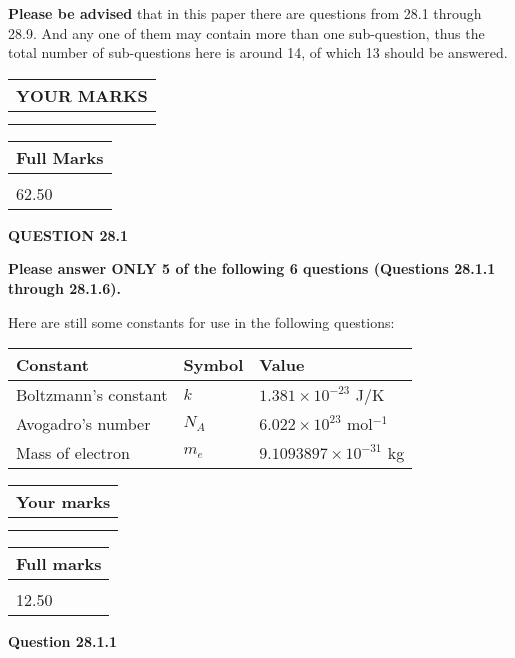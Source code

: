 \documentclass[12pt]{article}
\begin{document}
 
{\textbf{\large{Please be advised}}} that in this paper there are questions from
28.1 through
28.9.
And any one of them may contain more than one sub-question, thus the total number
of sub-questions here is around 14, of which
13 should be answered.
 
\vspace{0.3in}
 
 
   
   
  
\vspace{0.2in}
  
\noindent\begin{tabular}{|l|}
\hline
 YOUR MARKS  \\
\hline
 \\ 
 \\ 
\hline
\end{tabular}
\hspace{0.05in} \begin{tabular}{|l|}
\hline
 Full Marks  \\
\hline
 \\ 
62.50 \\
\hline
\end{tabular}
{\textbf{\Large{QUESTION
28.1 
}}}
  
  
 
{\textbf{\Large{Please answer ONLY
5 of the following
6 questions (Questions
28.1.1 through
28.1.6). }}}
 
Here are still some constants for use in the following questions:
 
 
\noindent\begin{tabular}{|l|l|l|}
\hline
Constant & Symbol & Value \\
\hline
 
Boltzmann's constant &
$k$ &
 $ 1.381 \times 10^{-23} $
J/K \\
\hline
 
Avogadro's number &
$N_A$ &
 $ 6.022 \times 10^{23} $
mol$^{-1}$ \\
\hline
 
Mass of electron &
$m_e$ &
 $ 9.1093897 \times 10^{-31} $
kg \\
\hline
 
\end{tabular}
 
  
\vspace{0.2in}
  
         \begin{tabular}{|l|}
\hline
 Your marks  \\
\hline
 \\ 
 \\ 
\hline
\end{tabular}
\hspace{0.05in} \begin{tabular}{|l|}
\hline
 Full marks  \\
\hline
 \\ 
12.50 \\
\hline
\end{tabular}
{\textbf{\Large{Question
28.1.1 
}}}
  
\end{document}
